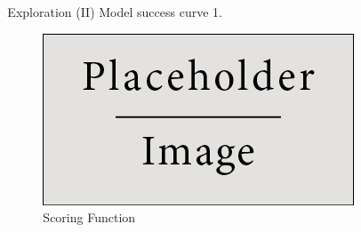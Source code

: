 \documentclass[final]{beamer}
\newlength{\sepwid}
\newlength{\onecolwid}
\newlength{\twocolwid}
\begin{document}
\begin{frame}[t]
\begin{columns}[t]
\begin{column}{\onecolwid}

\end{column} %

\begin{column}{\sepwid}\end{column} %

\begin{column}{\twocolwid} %



\begin{columns}[t, totalwidth=\twocolwid]

\begin{column}{\onecolwid}\vspace{-.6in.}
\begin{block}{Exploration (II)}
Model success curve 1.
\begin{figure}
\includegraphics[width=\linewidth]{placeholder.jpg}
\caption{Scoring Function}
\end{figure}
\end{block}

\end{column}


\end{columns}
\end{column}
\end{columns}
\end{frame}
\end{document}
